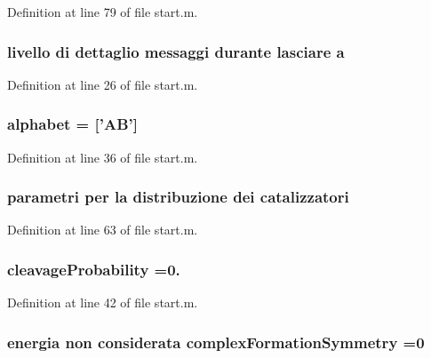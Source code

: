 Definition at line 79 of file start.\-m.

\hypertarget{a00065_a683f8d65c21f968751716fc09c13473b}{
\subsubsection[{a}]{\setlength{\rightskip}{0pt plus 5cm}livello di dettaglio messaggi durante lasciare a}}\label{a00065_a683f8d65c21f968751716fc09c13473b}


Definition at line 26 of file start.\-m.

\hypertarget{a00065_abcbc32fc68e4323620d6171a17310212}{
\subsubsection[{alphabet}]{\setlength{\rightskip}{0pt plus 5cm}alphabet = \mbox{[}'{\bf A\-B}'\mbox{]}}}\label{a00065_abcbc32fc68e4323620d6171a17310212}


Definition at line 36 of file start.\-m.

\hypertarget{a00065_a5a2da1d1b50e51c66813f40da0d9d0d1}{
\subsubsection[{catalizzatori}]{\setlength{\rightskip}{0pt plus 5cm}parametri per la distribuzione dei catalizzatori}}\label{a00065_a5a2da1d1b50e51c66813f40da0d9d0d1}


Definition at line 63 of file start.\-m.

\hypertarget{a00065_a9d512df05ee559766d2b8f08e4704b04}{
\subsubsection[{cleavage\-Probability}]{\setlength{\rightskip}{0pt plus 5cm}cleavage\-Probability =0.}}\label{a00065_a9d512df05ee559766d2b8f08e4704b04}


Definition at line 42 of file start.\-m.

\hypertarget{a00065_ac5d9cfec5453da5efc3e8d574b455833}{
\subsubsection[{complex\-Formation\-Symmetry}]{\setlength{\rightskip}{0pt plus 5cm}energia non {\bf considerata} complex\-Formation\-Symmetry =0}}\label{a00065_ac5d9cfec5453da5efc3e8d574b455833}


